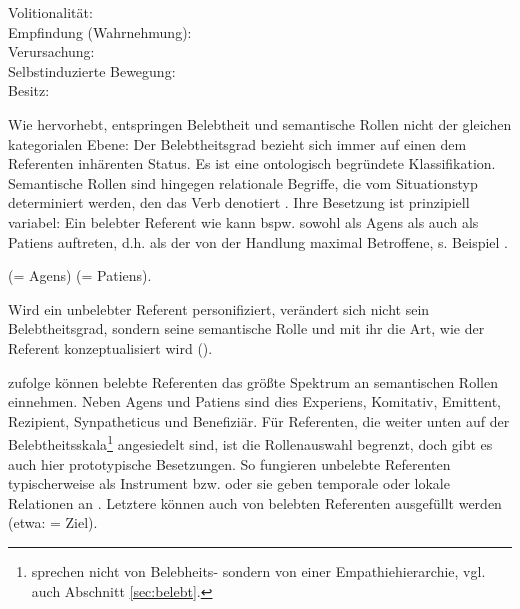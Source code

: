 \begin{description}
\item[Volitionalität:] 
\item[Empfindung (Wahrnehmung):]   
\item[Verursachung:]   
\item[Selbstinduzierte Bewegung:]  
\item[Besitz:] 
\end{description}

Wie \textcite[][151f.]{Yamamoto1999} hervorhebt, entspringen Belebtheit und semantische Rollen nicht der gleichen kategorialen Ebene: Der Belebtheitsgrad bezieht sich immer auf einen dem Referenten inhärenten Status. Es ist eine ontologisch begründete Klassifikation. Semantische Rollen sind hingegen relationale Begriffe, die vom Situationstyp determiniert werden, den das Verb denotiert \parencite[13]{Lehmann2004a}. Ihre Besetzung ist prinzipiell variabel: Ein belebter Referent wie  kann bspw. sowohl als Agens als auch als Patiens auftreten, d.h. als der von der Handlung maximal Betroffene, s. Beispiel . 
 
\begin{exe}
	\ex \label{ex:rollen}
	\begin{xlist}
	 	\ex {} (= Agens) 
		\ex {} (= Patiens).
 
	\end{xlist}
\end{exe}
\noindent
 
Wird ein unbelebter Referent personifiziert, verändert sich nicht sein Belebtheitsgrad, sondern seine semantische Rolle und mit ihr die Art, wie  der Referent konzeptualisiert wird (). 

\textcite[12]{Lehmann2004a} zufolge können belebte Referenten das größte Spektrum an semantischen Rollen einnehmen. Neben Agens und Patiens sind dies Experiens, Komitativ, Emittent, Rezipient, Synpatheticus und Benefiziär.  Für Referenten, die weiter unten auf der Belebtheitsskala\footnote{\textcite{Lehmann2004a} sprechen nicht von Belebheits- sondern von einer 
Empathiehierarchie, vgl. auch Abschnitt \ref{sec:belebt}.} angesiedelt sind, ist die Rollenauswahl begrenzt, doch gibt es auch hier prototypische Besetzungen. So fungieren unbelebte Referenten typischerweise als Instrument bzw.  oder sie geben temporale oder lokale Relationen an \parencite[76]{Primus2012}. Letztere können auch von belebten Referenten ausgefüllt werden (etwa:  = Ziel). 

